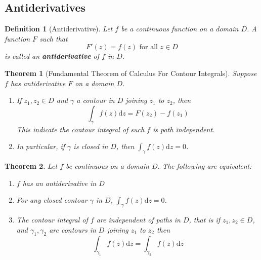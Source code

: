 \documentclass[12pt]{article}
\newcommand{\diff}{\mathrm{d}}
\newtheorem{definition}{Definition}[section]
\newtheorem{theorem}{Theorem}[section]
\theoremstyle{definition}
\begin{document}
\subsection{Antiderivatives}
\begin{definition}[Antiderivative]
\normalfont Let $f$ be a continuous function on a domain $D$. A function $F$ such that
\[
F'(z)=f(z)\text{ for all }z\in D
\]
is called an \textbf{antiderivative} of $f$ in $D$.
\end{definition}
\begin{theorem}[Fundamental Theorem of Calculus For Contour Integrals]
\normalfont Suppose $f$ has antiderivative $F$ on a domain $D$.
\begin{enumerate}
	\item If $z_1, z_2\in D$ and $\gamma$ a contour in $D$ joining $z_1$ to $z_2$, then
	\[
\int_\gamma f(z)\diff z = F(z_2)-f(z_1)
	\]
	This indicate the contour integral of such $f$ is path independent.
	\item In particular, if $\gamma$ is closed in $D$, then $\int_\gamma f(z)\diff z = 0$.
\end{enumerate}
\end{theorem}
\begin{theorem}Let $f$ be continuous on a domain $D$. The following are equivalent:
\begin{enumerate}
	\item $f$ has an antiderivative in $D$
	\item For any closed contour $\gamma$ in $D$, $\int_\gamma f(z)\diff z= 0$.
	\item The contour integral of $f$ are independent of paths in $D$, that is if $z_1, z_2\in D$, and $\gamma_1,\gamma_2$ are contours in $D$ joining $z_1$ to $z_2$ then
	\[
\int_{\gamma_1} f(z)\diff z = \int_{\gamma_2} f(z)\diff z
	\]
\end{enumerate}
\end{theorem}
\end{document}
